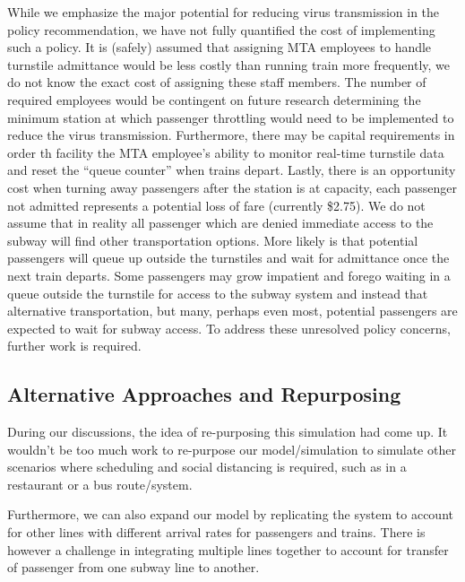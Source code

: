 \documentclass[12pt]{article}
\begin{document}
While we emphasize the major potential for reducing virus transmission in the policy recommendation, we have not fully quantified the cost of implementing such a policy.
It is (safely) assumed that assigning MTA employees to handle turnstile admittance would be less costly than running train more frequently, we do not know the exact cost of assigning these staff members.
The number of required employees would be contingent on future research determining the minimum station at which passenger throttling would need to be implemented to reduce the virus transmission.
Furthermore, there may be capital requirements in order th facility the MTA employee's ability to monitor real-time turnstile data and reset the ``queue counter'' when trains depart.
Lastly, there is an opportunity cost when turning away passengers after the station is at capacity, each passenger not admitted represents a potential loss of fare (currently \$2.75).
We do not assume that in reality all passenger which are denied immediate access to the subway will find other transportation options.
More likely is that potential passengers will queue up outside the turnstiles and wait for admittance once the next train departs.
Some passengers may grow impatient and forego waiting in a queue outside the turnstile for access to the subway system and instead that alternative transportation, but many, perhaps even most, potential passengers are expected to wait for subway access.
To address these unresolved policy concerns, further work is required.

\subsection{Alternative Approaches and Repurposing}

During our discussions, the idea of re-purposing this simulation had come up. It wouldn't be too much work to re-purpose our model/simulation to simulate other scenarios where scheduling and social distancing is required, such as in a restaurant or a bus route/system.

\hfill \newline
Furthermore, we can also expand our model by replicating the system to account for other lines with different arrival rates for passengers and trains. There is however a challenge in integrating multiple lines together to account for transfer of passenger from one subway line to another.
\end{document}
